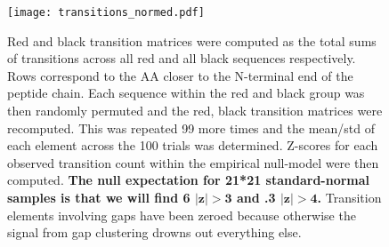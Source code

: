 \documentclass[a4paper,11pt]{article}
\begin{document}
\begin{figure}
\centerline{\texttt{[image: transitions\_normed.pdf]}}
\caption[Amino Acid Transition Matrix with Normalized Differences]{Red and black transition matrices were computed as the total sums of transitions across all red and all black sequences respectively. Rows correspond to the AA closer to the N-terminal end of the peptide chain. Each sequence within the red and black group was then randomly permuted and the red, black transition matrices were recomputed. This was repeated 99 more times and the mean/std of each element across the 100 trials was determined. Z-scores for each observed transition count within the empirical null-model were then computed. {\bf The null expectation for 21*21 standard-normal samples is that we will find 6 $\mathbf{\vert z\vert>3}$ and .3 $\mathbf{\vert z\vert>4}$.} Transition elements involving gaps have been zeroed because otherwise the signal from gap clustering drowns out everything else.}
\end{figure}
\end{document}
